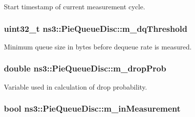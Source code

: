 Start timestamp of current measurement cycle. 

\subsubsection[{\texorpdfstring{m\+\_\+dq\+Threshold}{m_dqThreshold}}]{\setlength{\rightskip}{0pt plus 5cm}uint32\+\_\+t ns3\+::\+Pie\+Queue\+Disc\+::m\+\_\+dq\+Threshold\hspace{0.3cm}{\ttfamily [private]}}\hypertarget{classns3_1_1PieQueueDisc_a010bb75fa254f100eece3b71825aa5cc}{}\label{classns3_1_1PieQueueDisc_a010bb75fa254f100eece3b71825aa5cc}


Minimum queue size in bytes before dequeue rate is measured. 

\subsubsection[{\texorpdfstring{m\+\_\+drop\+Prob}{m_dropProb}}]{\setlength{\rightskip}{0pt plus 5cm}double ns3\+::\+Pie\+Queue\+Disc\+::m\+\_\+drop\+Prob\hspace{0.3cm}{\ttfamily [private]}}\hypertarget{classns3_1_1PieQueueDisc_a532858948ab061df8daceaa7c798814d}{}\label{classns3_1_1PieQueueDisc_a532858948ab061df8daceaa7c798814d}


Variable used in calculation of drop probability. 

\subsubsection[{\texorpdfstring{m\+\_\+in\+Measurement}{m_inMeasurement}}]{\setlength{\rightskip}{0pt plus 5cm}bool ns3\+::\+Pie\+Queue\+Disc\+::m\+\_\+in\+Measurement\hspace{0.3cm}{\ttfamily [private]}}\hypertarget{classns3_1_1PieQueueDisc_a93d085fcecf8febe3144f913f230e357}{}\label{classns3_1_1PieQueueDisc_a93d085fcecf8febe3144f913f230e357}


